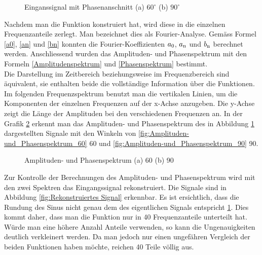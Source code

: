  

\begin{figure}[h]
	\centering
	\qquad
	\caption{Einganssignal mit Phasenanschnitt (a) $60^\circ$ (b) $90^\circ$}
	\label{fig:eingangssignal_mit_Matlab}
\end{figure} 

Nachdem man die Funktion konstruiert hat, wird diese in die einzelnen Frequenzanteile zerlegt. Man bezeichnet dies als Fourier-Analyse. Gemäss Formel \ref{a0}, \ref{an} und \ref{bn} konnten die Fourier-Koeffizienten $a\textsubscript{0}$, $a\textsubscript{n}$ und $b\textsubscript{n}$ berechnet werden. Anschliessend wurden das Amplituden- und Phasenspektrum mit den Formeln \ref{Amplitudenspektrum} und \ref{Phasenspektrum} bestimmt.\\ 
Die Darstellung im Zeitbereich beziehungsweise im Frequenzbereich sind äquivalent, sie enthalten beide die vollständige Information über die Funktionen. Im folgenden Frequenzspektrum benutzt man die vertikalen Linien, um die Komponenten der einzelnen Frequenzen auf der x-Achse anzugeben. Die y-Achse zeigt die Länge der Amplituden bei den verschiedenen Frequenzen an. In der Grafik \ref{fig:Amplituden- und Phasenspektrum} erkennt man das Amplituden- und Phasenspektrum des in Abbildung \ref{fig:eingangssignal_mit_Matlab} dargestellten Signale mit den Winkeln von \ref{fig:Amplituden-und_Phasenspektrum_60} 60\textdegree \hspace{0.02cm} und \ref{fig:Amplituden-und_Phasenspektrum_90} 90\textdegree \hspace{0.02cm}.

\begin{figure}[h]
	\centering
	\qquad
	\caption{Amplituden- und Phasenspektrum (a) 60\textdegree \hspace{0.02cm} (b) 90\textdegree}
	\label{fig:Amplituden- und Phasenspektrum}
\end{figure} 

Zur Kontrolle der Berechnungen des Amplituden- und Phasenspektrum wird mit den zwei Spektren das Eingangssignal rekonstruiert. Die Signale sind in Abbildung \ref{fig:Rekonstruiertes Signal} erkennbar. Es ist ersichtlich, dass die Rundung des Sinus nicht genau dem des eigentlichen Signals entspricht \ref{fig:eingangssignal_mit_Matlab}. Dies kommt daher, dass man die Funktion  \grqq nur\grqq\hspace{0.02cm} in 40 Frequenzanteile unterteilt hat. Würde man eine höhere Anzahl Anteile verwenden, so kann die Ungenauigkeiten deutlich verkleinert werden. Da man jedoch nur einen ungefähren Vergleich der beiden Funktionen haben möchte, reichen 40 Teile völlig aus. 

